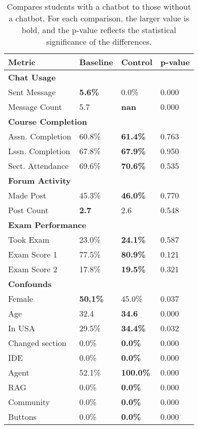 \begin{table}
\centering
\begin{tabularx}{\columnwidth}{l X X X}
\toprule
\textbf{Metric} & \textbf{Baseline} & \textbf{Control} & \textbf{p-value} \\
\midrule
\multicolumn{4}{l}{\textbf{Chat Usage}} \\
Sent Message & \textbf{5.6\%} & 0.0\% & 0.000 \\
Message Count & 5.7 & \textbf{nan} & 0.000 \\
\midrule
\multicolumn{4}{l}{\textbf{Course Completion}} \\
Assn. Completion & 60.8\% & \textbf{61.4\%} & 0.763 \\
Lssn. Completion & 67.8\% & \textbf{67.9\%} & 0.950 \\
Sect. Attendance & 69.6\% & \textbf{70.6\%} & 0.535 \\
\midrule
\multicolumn{4}{l}{\textbf{Forum Activity}} \\
Made Post & 45.3\% & \textbf{46.0\%} & 0.770 \\
Post Count & \textbf{2.7} & 2.6 & 0.548 \\
\midrule
\multicolumn{4}{l}{\textbf{Exam Performance}} \\
Took Exam & 23.0\% & \textbf{24.1\%} & 0.587 \\
Exam Score 1 & 77.5\% & \textbf{80.9\%} & 0.121 \\
Exam Score 2 & 17.8\% & \textbf{19.5\%} & 0.321 \\
\midrule
\multicolumn{4}{l}{\textbf{Confounds}} \\
Female & \textbf{50.1\%} & 45.0\% & 0.037 \\
Age & 32.4 & \textbf{34.6} & 0.000 \\
In USA & 29.5\% & \textbf{34.4\%} & 0.032 \\
Changed section & 0.0\% & \textbf{0.0\%} & 0.000 \\
IDE & 0.0\% & \textbf{0.0\%} & 0.000 \\
Agent & 52.1\% & \textbf{100.0\%} & 0.000 \\
RAG & 0.0\% & \textbf{0.0\%} & 0.000 \\
Community & 0.0\% & \textbf{0.0\%} & 0.000 \\
Buttons & 0.0\% & \textbf{0.0\%} & 0.000 \\
\bottomrule
\end{tabularx}
\caption{Compares students with a chatbot to those without a chatbot. For each comparison, the larger value is bold, and the p-value reflects the statistical significance of the differences.}
\label{tab:control-table}
\end{table}